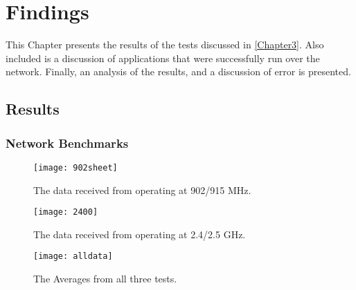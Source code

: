 
\chapter{Findings} %

\label{Chapter4} %

This Chapter presents the results of the tests discussed in \ref{Chapter3}. Also included is a discussion of applications that were successfully run over the network. Finally, an analysis of the results, and a discussion of error is presented. 




\section{Results}

\subsection{Network Benchmarks}

\begin{figure}
	\centering
	\texttt{[image: 902sheet]}
	\caption{The data received from operating at 902/915 MHz.}
	\label{fig:902}
\end{figure}

\begin{figure}
	\centering
	\texttt{[image: 2400]}
	\caption{The data received from operating at 2.4/2.5 GHz.}
	\label{fig:2400}
\end{figure}

\begin{figure}
	\centering
	\texttt{[image: alldata]}
	\caption{The Averages from all three tests.}
	\label{fig:alldata}
\end{figure}


